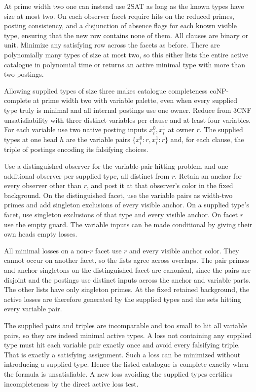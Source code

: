 At prime width two one can instead use
2SAT as long as the known types have
size at most two. On each observer
facet require hits on the reduced primes,
posting consistency, and a disjunction
of absence flags for each known visible
type, ensuring that the new row contains
none of them. All clauses are binary
or unit. Minimize any satisfying row
across the facets as before.
There are polynomially many types of
size at most two, so this either lists
the entire active catalogue in polynomial
time or returns an active minimal type
with more than two postings.

Allowing supplied types of size three
makes catalogue completeness coNP-complete
at prime width two with variable palette,
even when every supplied type truly is
minimal and all internal postings use one
owner. Reduce from 3CNF unsatisfiability
with three distinct variables per clause
and at least four variables. For each
variable use two native posting inputs
$x_i^0,x_i^1$ at owner $r$. The supplied
types at one head $h$ are the variable
pairs $\{x_i^0:r,x_i^1:r\}$ and, for each
clause, the triple of postings encoding
its falsifying choices.

Use a distinguished observer for the
variable-pair hitting problem and one
additional observer per supplied type,
all distinct from $r$. Retain an anchor
for every observer other than $r$, and
post it at that observer's color in the
fixed background. On the distinguished
facet, use the variable pairs as width-two
primes and add singleton exclusions of
every visible anchor. On a supplied type's
facet, use singleton exclusions of that
type and every visible anchor. On facet
$r$ use the empty guard. The variable
inputs can be made conditional by giving
their own heads empty losses.

All minimal losses on a non-$r$ facet
use $r$ and every visible anchor color.
They cannot occur on another facet, so
the lists agree across overlaps. The
pair primes and anchor singletons on
the distinguished facet are canonical,
since the pairs are disjoint and the
postings use distinct inputs across
the anchor and variable parts. The
other lists have only singleton primes.
At the fixed retained background, the
active losses are therefore generated
by the supplied types and the sets
hitting every variable pair.

The supplied pairs and triples are
incomparable and too small to hit all
variable pairs, so they are indeed
minimal active types. A loss not
containing any supplied type must
hit each variable pair exactly once
and avoid every falsifying triple.
That is exactly a satisfying assignment.
Such a loss can be minimized without
introducing a supplied type. Hence the
listed catalogue is complete exactly
when the formula is unsatisfiable.
A new loss avoiding the supplied types
certifies incompleteness by the direct
active loss test.

